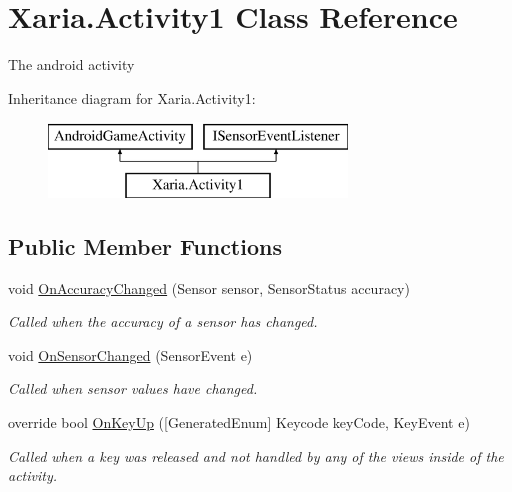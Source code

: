 \hypertarget{classXaria_1_1Activity1}{}\section{Xaria.\+Activity1 Class Reference}
\label{classXaria_1_1Activity1}


The android activity  


Inheritance diagram for Xaria.\+Activity1\+:\begin{figure}[H]
\begin{center}
\leavevmode
\includegraphics[height=2.000000cm]{classXaria_1_1Activity1}
\end{center}
\end{figure}
\subsection*{Public Member Functions}
\begin{DoxyCompactItemize}
\item 
void \hyperlink{classXaria_1_1Activity1_aadf94688926beaaf66d1000b73662a43}{On\+Accuracy\+Changed} (Sensor sensor, Sensor\+Status accuracy)
\begin{DoxyCompactList}\small\item\em Called when the accuracy of a sensor has changed. \end{DoxyCompactList}\item 
void \hyperlink{classXaria_1_1Activity1_a9a7df9c23656ef7839a8fddd1e14dc49}{On\+Sensor\+Changed} (Sensor\+Event e)
\begin{DoxyCompactList}\small\item\em Called when sensor values have changed. \end{DoxyCompactList}\item 
override bool \hyperlink{classXaria_1_1Activity1_ab27a73ce9dd28a79774b7c10e3630235}{On\+Key\+Up} (\mbox{[}Generated\+Enum\mbox{]} Keycode key\+Code, Key\+Event e)
\begin{DoxyCompactList}\small\item\em Called when a key was released and not handled by any of the views inside of the activity. \end{DoxyCompactList}\end{DoxyCompactItemize}
